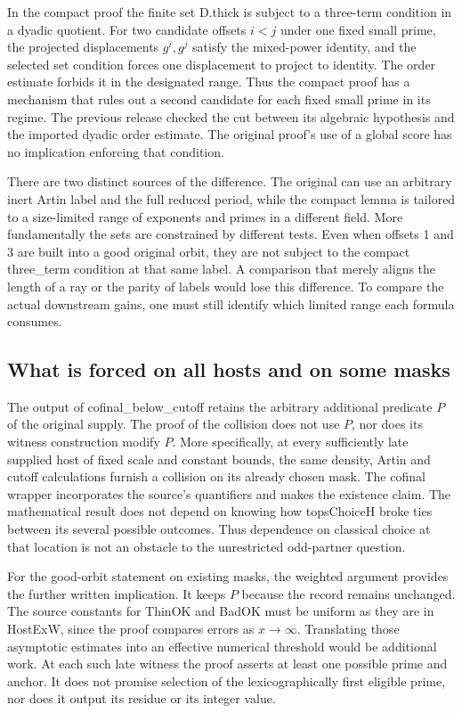 \documentclass[12pt,letterpaper]{article}
\DeclareRobustCommand{\id}[1]{\mbox{\small\ttfamily #1}}
\begin{document}
In the compact proof the finite set \id{D.thick} is subject to a three-term condition in a dyadic quotient. For two candidate offsets \(i<j\) under one fixed small prime, the projected displacements \(g^i,g^j\) satisfy the mixed-power identity, and the selected set condition forces one displacement to project to identity. The order estimate forbids it in the designated range. Thus the compact proof has a mechanism that rules out a second candidate for each fixed small prime in its regime. The previous release checked the cut between its algebraic hypothesis and the imported dyadic order estimate. The original proof's use of a global score has no implication enforcing that condition.

There are two distinct sources of the difference. The original can use an arbitrary inert Artin label and the full reduced period, while the compact lemma is tailored to a size-limited range of exponents and primes in a different field. More fundamentally the sets are constrained by different tests. Even when offsets 1 and 3 are built into a good original orbit, they are not subject to the compact \id{three\_term} condition at that same label. A comparison that merely aligns the length of a ray or the parity of labels would lose this difference. To compare the actual downstream gains, one must still identify which limited range each formula consumes.

\subsection{What is forced on all hosts and on some masks}

The output of \id{cofinal\_below\_cutoff} retains the arbitrary additional predicate \(P\) of the original supply. The proof of the collision does not use \(P\), nor does its witness construction modify \(P\). More specifically, at every sufficiently late supplied host of fixed scale and constant bounds, the same density, Artin and cutoff calculations furnish a collision on its already chosen mask. The cofinal wrapper incorporates the source's quantifiers and makes the existence claim. The mathematical result does not depend on knowing how \id{topsChoiceH} broke ties between its several possible outcomes. Thus dependence on classical choice at that location is not an obstacle to the unrestricted odd-partner question.

For the good-orbit statement on existing masks, the weighted argument provides the further written implication. It keeps \(P\) because the record remains unchanged. The source constants for \id{ThinOK} and \id{BadOK} must be uniform as they are in \id{HostExW}, since the proof compares errors as \(x\to\infty\). Translating those asymptotic estimates into an effective numerical threshold would be additional work. At each such late witness the proof asserts at least one possible prime and anchor. It does not promise selection of the lexicographically first eligible prime, nor does it output its residue or its integer value.
\end{document}
